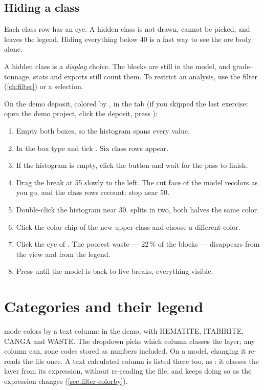 \subsection{Hiding a class}
Each class row has an eye. A hidden class is not drawn, cannot be picked, and leaves the legend. Hiding everything below 40 is a fast way to see the ore body alone.

\begin{caution}
A hidden class is a \emph{display} choice. The blocks are still in the model, and grade–tonnage, stats and exports still count them. To restrict an analysis, use the filter (\cref{ch:filter}) or a selection.
\end{caution}

\begin{tryit}
On the demo deposit, colored by , in the  tab (if you skipped the last exercise: open the demo project, click the deposit, press ):
\begin{enumerate}
\item Empty both  boxes, so the histogram spans every value.
\item In the  box type  and tick . Six class rows appear.
\item If the histogram is empty, click the  button and wait for the pass to finish.
\item Drag the break at 55 slowly to the left. The cut face of the model recolors as you go, and the class rows recount; stop near 50.
\item Double-click the histogram near 30.  splits in two, both halves the same color.
\item Click the color chip of the new upper class and choose a different color.
\item Click the eye of . The poorest waste — 22\,\% of the blocks — disappears from the view and from the legend.
\item Press  until the model is back to five breaks, everything visible.
\end{enumerate}
\end{tryit}

\section{Categories and their legend}\label{sec:color-categories}
 mode colors by a text column:  in the demo, with HEMATITE, ITABIRITE, CANGA and WASTE. The  dropdown picks which column classes the layer; any column can, zone codes stored as numbers included. On a model, changing it re-reads the file once. A text calculated column is listed there too, as : it classes the layer from its expression, without re-reading the file, and keeps doing so as the expression changes (\cref{sec:filter-colorby}).

